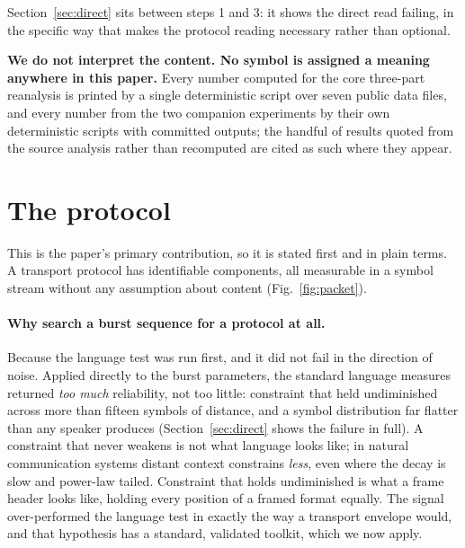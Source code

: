 \documentclass[11pt,a4paper]{article}
\begin{document}
Section~\ref{sec:direct} sits between steps 1 and 3: it shows the direct read failing,
in the specific way that makes the protocol reading necessary rather than optional.

\textbf{We do not interpret the content. No symbol is assigned a meaning anywhere in
this paper.} Every number computed for the core three-part reanalysis is printed by a
single deterministic script over seven public data files, and every number from the
two companion experiments by their own deterministic scripts with committed outputs;
the handful of results quoted from
the source analysis rather than recomputed are cited as such where they appear.

\section{The protocol}

This is the paper's primary contribution, so it is stated first and in plain terms. A
transport protocol has identifiable components, all measurable in a symbol stream
without any assumption about content (Fig.~\ref{fig:packet}).

\paragraph{Why search a burst sequence for a protocol at all.} Because the language
test was run first, and it did not fail in the direction of noise. Applied directly to
the burst parameters, the standard language measures returned \emph{too much}
reliability, not too little: constraint that held undiminished across more than fifteen
symbols of distance, and a symbol distribution far flatter than any speaker produces
(Section~\ref{sec:direct} shows the failure in full). A constraint that never weakens
is not what language looks like; in natural communication systems distant context
constrains \emph{less}, even where the decay is slow and power-law tailed. Constraint
that holds undiminished is what a frame header looks like, holding every
position of a framed format equally. The signal over-performed the language test in
exactly the way a transport envelope would, and that hypothesis has a standard,
validated toolkit, which we now apply.
\end{document}
